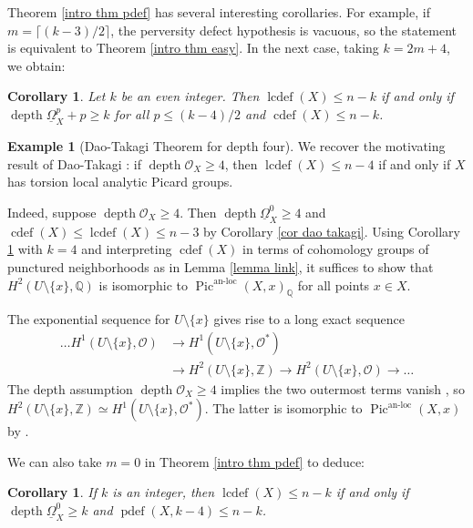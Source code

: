 \documentclass[11pt]{amsart}
\newtheorem{corollary}[equation]{Corollary}
\theoremstyle{definition}
\newtheorem{example}[equation]{Example}
\theoremstyle{plain}
\newcounter{intro}
\DeclareMathOperator{\Pic}{Pic}
\DeclareMathOperator{\lcdef}{lcdef}
\DeclareMathOperator{\cdef}{cdef}
\DeclareMathOperator{\pdef}{pdef}
\DeclareMathOperator{\depth}{depth}
\DeclareMathOperator{\anloc}{an-loc}
\begin{document}
Theorem \ref{intro thm pdef} has several interesting corollaries. For example, if $m = \lceil (k-3)/2 \rceil$, the perversity defect hypothesis is vacuous, so the statement is equivalent to Theorem \ref{intro thm easy}. In the next case, taking $k=2m+4$, we obtain:

\begin{corollary}\label{cor cdef}
Let $k$ be an even integer. Then $\lcdef(X) \leq n-k$ if and only if $\depth \underline{\Omega}_X^p + p \geq k$ for all $p \leq (k-4)/2$ and $\cdef(X) \leq n-k$.
\end{corollary}

\begin{example}[Dao-Takagi Theorem for depth four]\label{example dt}
We recover the motivating result of Dao-Takagi \cite{dao takagi}: if $\depth \mathscr{O}_X \geq 4$, then $\lcdef(X) \leq n-4$ if and only if $X$ has torsion local analytic Picard groups.

Indeed, suppose $\depth \mathscr{O}_X \geq 4$. Then $\depth \underline{\Omega}_X^0 \geq 4$ and $\cdef(X) \leq \lcdef(X) \leq n-3$ by Corollary \ref{cor dao takagi}. Using Corollary \ref{cor cdef} with $k=4$ and interpreting $\cdef(X)$ in terms of cohomology groups of punctured neighborhoods as in Lemma \ref{lemma link}, it suffices to show that $H^{2}(U \setminus \{ x\}, \mathbb{Q})$ is isomorphic to $\Pic^{\anloc}(X,x)_\mathbb{Q}$ for all points $x \in X$.

The exponential sequence for $U \setminus \{ x\}$ gives rise to a long exact sequence
\begin{align*}
    \ldots H^1(U \setminus \{ x\}, \mathscr{O})& \rightarrow H^1(U \setminus \{ x\}, \mathscr{O}^*) \\& \rightarrow H^2(U \setminus \{ x\}, \mathbb{Z}) \rightarrow H^2(U \setminus \{ x\}, \mathscr{O}) \rightarrow \ldots
\end{align*}
The depth assumption $\depth \mathscr{O}_X \geq 4$ implies the two outermost terms vanish \cite[Theorem $1.14$]{siu}, so $H^2(U \setminus \{ x\}, \mathbb{Z}) \simeq H^1(U \setminus \{ x \}, \mathscr{O}^*)$. The latter is isomorphic to $\Pic^{\anloc}(X,x)$ by \cite[Section $1$]{kollar}.
\end{example}

We can also take $m = 0$ in Theorem \ref{intro thm pdef} to deduce:

\begin{corollary}\label{cor pdef}
If $k$ is an integer, then $\lcdef(X) \leq n-k$ if and only if $\depth \underline{\Omega}_X^0 \geq k$ and $\pdef(X,k-4) \leq n-k$.
\end{corollary}
\end{document}
